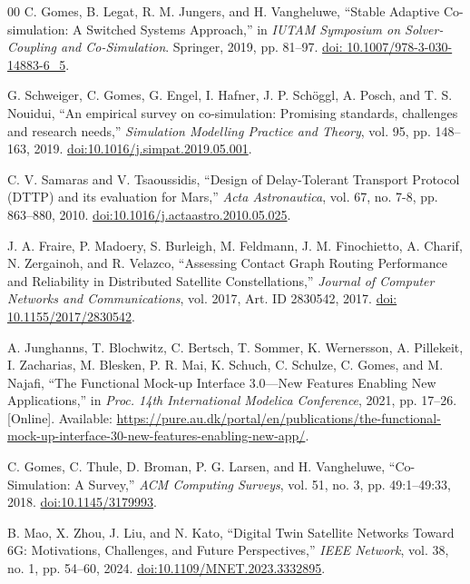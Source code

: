 \documentclass[a4paper,fleqn]{cas-sc}
\begin{document}
\begin{thebibliography}{00}
 {\color{revcolor}C. Gomes, B. Legat, R. M. Jungers, and H. Vangheluwe, ``Stable Adaptive Co-simulation: A Switched Systems Approach,'' in \textit{IUTAM Symposium on Solver-Coupling and Co-Simulation}. Springer, 2019, pp. 81--97. \href{https://doi.org/10.1007/978-3-030-14883-6_5}{doi: 10.1007/978-3-030-14883-6\_5}.}

 {\color{revcolor}G. Schweiger, C. Gomes, G. Engel, I. Hafner, J. P. Sch\"oggl, A. Posch, and T. S. Nouidui, ``An empirical survey on co-simulation: Promising standards, challenges and research needs,'' \textit{Simulation Modelling Practice and Theory}, vol. 95, pp. 148--163, 2019. \href{https://doi.org/10.1016/j.simpat.2019.05.001}{doi:10.1016/j.simpat.2019.05.001}.}

 C. V. Samaras and V. Tsaoussidis, ``Design of Delay-Tolerant Transport Protocol (DTTP) and its evaluation for Mars,'' \textit{Acta Astronautica}, vol. 67, no. 7-8, pp. 863--880, 2010. \href{https://doi.org/10.1016/j.actaastro.2010.05.025}{doi:10.1016/j.actaastro.2010.05.025}.

 J. A. Fraire, P. Madoery, S. Burleigh, M. Feldmann, J. M. Finochietto, A. Charif, N. Zergainoh, and R. Velazco, ``Assessing Contact Graph Routing Performance and Reliability in Distributed Satellite Constellations,'' \textit{Journal of Computer Networks and Communications}, vol. 2017, Art. ID 2830542, 2017. \href{https://doi.org/10.1155/2017/2830542}{doi: 10.1155/2017/2830542}.

 {\color{revcolor}A. Junghanns, T. Blochwitz, C. Bertsch, T. Sommer, K. Wernersson, A. Pillekeit, I. Zacharias, M. Blesken, P. R. Mai, K. Schuch, C. Schulze, C. Gomes, and M. Najafi, ``The Functional Mock-up Interface 3.0---New Features Enabling New Applications,'' in \textit{Proc. 14th International Modelica Conference}, 2021, pp. 17--26. [Online]. Available: \url{https://pure.au.dk/portal/en/publications/the-functional-mock-up-interface-30-new-features-enabling-new-app/}.}

 {\color{revcolor}C. Gomes, C. Thule, D. Broman, P. G. Larsen, and H. Vangheluwe, ``Co-Simulation: A Survey,'' \textit{ACM Computing Surveys}, vol. 51, no. 3, pp. 49:1--49:33, 2018. \href{https://doi.org/10.1145/3179993}{doi:10.1145/3179993}.}

 {\color{revcolor}B. Mao, X. Zhou, J. Liu, and N. Kato, ``Digital Twin Satellite Networks Toward 6G: Motivations, Challenges, and Future Perspectives,'' \textit{IEEE Network}, vol. 38, no. 1, pp. 54--60, 2024. \href{https://doi.org/10.1109/MNET.2023.3332895}{doi:10.1109/MNET.2023.3332895}.}


\end{thebibliography}
\end{document}
